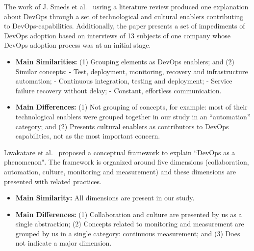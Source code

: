 The work of J. Smeds et al.~\cite{devops_a_definition_xp_15} usring a literature
review produced one explanation about DevOps through a set of technological and
cultural enablers contributing to DevOps-capabilities. Additionally, the paper
presents a set of impediments of DevOps adoption based on interviews of 13
subjects of one company whose DevOps adoption process was at an initial stage.
\begin{itemize}
\item \textbf{Main Similarities:}
  (1) Grouping elements as DevOps enablers; and
  (2) Similar concepts:\newline
    - Test, deployment, monitoring, recovery and infrastructure automation;\newline
    - Continuous integration, testing and deployment;\newline
    - Service failure recovery without delay;\newline
    - Constant, effortless communication.\newline
\item \textbf{Main Differences:}
(1) Not grouping of concepts, for example: most of their technological enablers
were grouped together in our study in an ``automation” category; and (2) Presents
cultural enablers as contributors to DevOps capabilities, not as the most
important concern.
\end{itemize}

Lwakatare et al.~\cite{extending_dimensions_icsea_16} proposed a conceptual
framework to explain ``DevOps as a phenomenon". The framework is organized around
five dimensions (collaboration, automation, culture, monitoring and measurement)
and these dimensions are presented with related practices.
\begin{itemize}
\item \textbf{Main Similarity:}
  All dimensions are present in our study.

\item \textbf{Main Differences:}
  (1) Collaboration and culture are presented by us as a single abstraction;
  (2) Concepts related to monitoring and measurement are grouped by us in a single
  category: continuous measurement; and (3) Does not indicate a major dimension.
\end{itemize}

